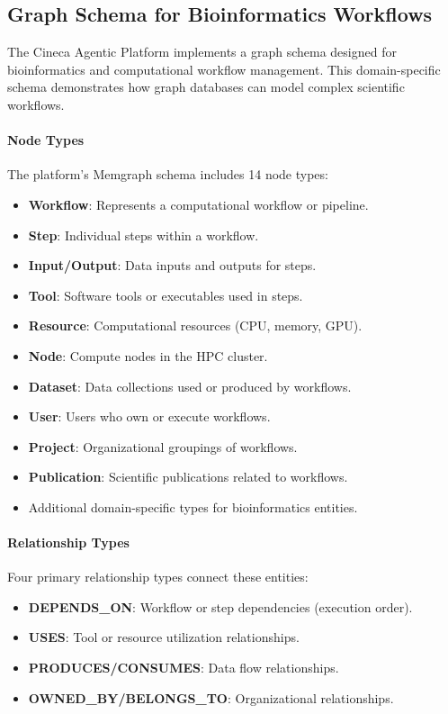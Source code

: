 \subsection{Graph Schema for Bioinformatics Workflows}

The Cineca Agentic Platform implements a graph schema designed for bioinformatics and computational workflow management. This domain-specific schema demonstrates how graph databases can model complex scientific workflows.

\paragraph{Node Types}

The platform's Memgraph schema includes 14 node types:

\begin{itemize}
    \item \textbf{Workflow}: Represents a computational workflow or pipeline.
    \item \textbf{Step}: Individual steps within a workflow.
    \item \textbf{Input/Output}: Data inputs and outputs for steps.
    \item \textbf{Tool}: Software tools or executables used in steps.
    \item \textbf{Resource}: Computational resources (CPU, memory, GPU).
    \item \textbf{Node}: Compute nodes in the HPC cluster.
    \item \textbf{Dataset}: Data collections used or produced by workflows.
    \item \textbf{User}: Users who own or execute workflows.
    \item \textbf{Project}: Organizational groupings of workflows.
    \item \textbf{Publication}: Scientific publications related to workflows.
    \item Additional domain-specific types for bioinformatics entities.
\end{itemize}

\paragraph{Relationship Types}

Four primary relationship types connect these entities:

\begin{itemize}
    \item \textbf{DEPENDS\_ON}: Workflow or step dependencies (execution order).
    \item \textbf{USES}: Tool or resource utilization relationships.
    \item \textbf{PRODUCES/CONSUMES}: Data flow relationships.
    \item \textbf{OWNED\_BY/BELONGS\_TO}: Organizational relationships.
\end{itemize}

